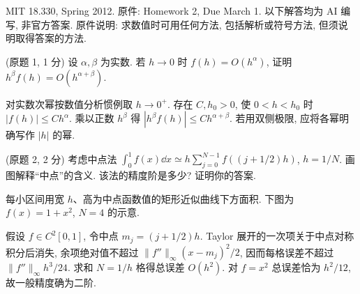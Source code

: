 MIT 18.330, Spring 2012. 原件: Homework 2, Due March 1. 以下解答均为 AI 编写, 非官方答案. 原件说明: 求数值时可用任何方法, 包括解析或符号方法, 但须说明取得答案的方法.

\begin{exercise}\label{ps2-q1}
(原题 1, 1 分) 设 $\alpha,\beta$ 为实数. 若 $h\to0$ 时 $f(h)=O(h^\alpha)$, 证明 $h^\beta f(h)=O(h^{\alpha+\beta})$.
\end{exercise}
\begin{solution}
对实数次幂按数值分析惯例取 $h\to0^+$. 存在 $C,h_0>0$, 使 $0<h<h_0$ 时 $|f(h)|\le Ch^\alpha$. 乘以正数 $h^\beta$ 得 $|h^\beta f(h)|\le Ch^{\alpha+\beta}$. 若用双侧极限, 应将各幂明确写作 $|h|$ 的幂.
\end{solution}

\begin{exercise}\label{ps2-q2}
(原题 2, 2 分) 考虑中点法
$\int_0^1 f(x)\dd x\simeq h\sum_{j=0}^{N-1}f((j+1/2)h)$, $h=1/N$.
画图解释“中点”的含义. 该法的精度阶是多少? 证明你的答案.
\end{exercise}
\begin{solution}
每小区间用宽 $h$、高为中点函数值的矩形近似曲线下方面积. 下图为 $f(x)=1+x^2$, $N=4$ 的示意.
\begin{center}
\end{center}
假设 $f\in C^2[0,1]$, 令中点 $m_j=(j+1/2)h$. Taylor 展开的一次项关于中点对称积分后消失, 余项绝对值不超过 $\|f''\|_\infty(x-m_j)^2/2$, 因而每格误差不超过 $\|f''\|_\infty h^3/24$. 求和 $N=1/h$ 格得总误差 $O(h^2)$. 对 $f=x^2$ 总误差恰为 $h^2/12$, 故一般精度确为二阶.
\end{solution}

